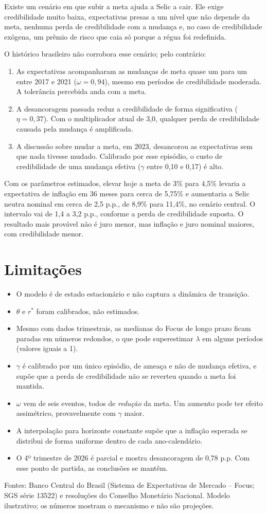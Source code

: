 \documentclass[11pt,a4paper]{article}
\begin{document}
Existe um cenário em que subir a meta ajuda a Selic a cair. Ele exige credibilidade muito baixa, expectativas presas a um nível que não depende da meta, nenhuma perda de credibilidade com a mudança e, no caso de credibilidade exógena, um prêmio de risco que caia só porque a régua foi redefinida.

O histórico brasileiro não corrobora esse cenário; pelo contrário:
\begin{enumerate}
  \item As expectativas acompanharam as mudanças de meta quase um para um entre 2017 e 2021 ($\omega=0{,}94$), mesmo em períodos de credibilidade moderada. A tolerância percebida anda com a meta.
  \item A desancoragem passada reduz a credibilidade de forma significativa ($\eta=0{,}37$). Com o multiplicador atual de 3,0, qualquer perda de credibilidade causada pela mudança é amplificada.
  \item A discussão sobre mudar a meta, em 2023, desancorou as expectativas sem que nada tivesse mudado. Calibrado por esse episódio, o custo de credibilidade de uma mudança efetiva ($\gamma$ entre 0,10 e 0,17) é alto.
\end{enumerate}

Com os parâmetros estimados, elevar hoje a meta de 3\% para 4,5\% levaria a expectativa de inflação em 36 meses para cerca de 5,75\% e aumentaria a Selic neutra nominal em cerca de 2,5 p.p., de 8,9\% para 11,4\%, no cenário central. O intervalo vai de 1,4 a 3,2 p.p., conforme a perda de credibilidade suposta. O resultado mais provável não é juro menor, mas inflação e juro nominal maiores, com credibilidade menor.

\section{Limitações}

\begin{itemize}
  \item O modelo é de estado estacionário e não captura a dinâmica de transição.
  \item $\theta$ e $r^{*}$ foram calibrados, não estimados.
  \item Mesmo com dados trimestrais, as medianas do Focus de longo prazo ficam paradas em números redondos, o que pode superestimar $\lambda$ em alguns períodos (valores iguais a 1).
  \item $\gamma$ é calibrado por um único episódio, de ameaça e não de mudança efetiva, e supõe que a perda de credibilidade não se reverteu quando a meta foi mantida.
  \item $\omega$ vem de seis eventos, todos de \emph{redução} da meta. Um aumento pode ter efeito assimétrico, provavelmente com $\gamma$ maior.
  \item A interpolação para horizonte constante supõe que a inflação esperada se distribui de forma uniforme dentro de cada ano-calendário.
  \item O 4º trimestre de 2026 é parcial e mostra desancoragem de 0,78 p.p. Com esse ponto de partida, as conclusões se mantêm.
\end{itemize}

\vspace{1em}
{\footnotesize\color{gray} Fontes: Banco Central do Brasil (Sistema de Expectativas de Mercado -- Focus; SGS série 13522) e resoluções do Conselho Monetário Nacional. Modelo ilustrativo; os números mostram o mecanismo e não são projeções.}
\end{document}
